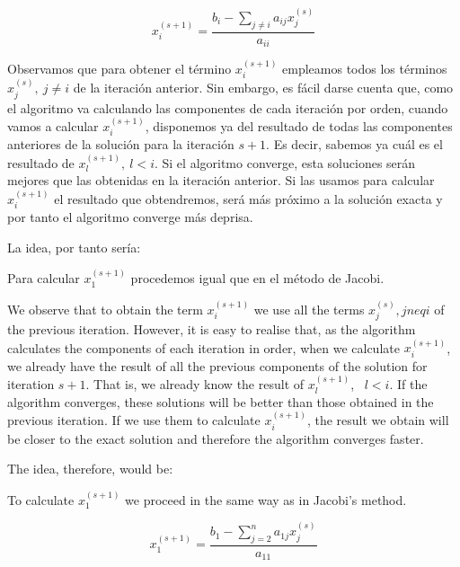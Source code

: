 \begin{equation*}
x_i^{(s+1)}=\frac{b_i-\sum_{j\neq i}a_{ij}x_j^{(s)}}{a_{ii}}
\end{equation*}
\begin{paracol}{2}

Observamos que para obtener el término $x_i^{(s+1)}$ empleamos todos los términos $x_j^{(s)}, \ j\neq i$ de la iteración anterior. Sin embargo, es fácil darse cuenta que, como el algoritmo va calculando las componentes de cada iteración por orden, cuando vamos a calcular $x_i^{(s+1)}$, disponemos ya del resultado de todas las componentes anteriores de la solución para la iteración $s+1$. Es decir, sabemos ya cuál es el resultado de $x_l^{(s+1)}, \  l<i$. Si el algoritmo converge, esta soluciones serán mejores que las obtenidas en la iteración anterior. Si las usamos para calcular $x_i^{(s+1)}$ el resultado que obtendremos, será más próximo a la solución exacta y por tanto el algoritmo converge más deprisa.

La idea, por tanto sería: 

Para calcular $x_1^{(s+1)}$ procedemos igual que en el método de Jacobi. 

\switchcolumn

We observe that to obtain the term $x_i^{(s+1)}$ we use all the terms $x_j^{(s)}, jneq i$ of the previous iteration. However, it is easy to realise that, as the algorithm calculates the components of each iteration in order, when we calculate $x_i^{(s+1)}$, we already have the result of all the previous components of the solution for iteration $s+1$. That is, we already know the result of $x_l^{(s+1)}$, \ $l<i$. If the algorithm converges, these solutions will be better than those obtained in the previous iteration. If we use them to calculate $x_i^{(s+1)}$, the result we obtain will be closer to the exact solution and therefore the algorithm converges faster.

The idea, therefore, would be: 

To calculate $x_1^{(s+1)}$ we proceed in the same way as in Jacobi's method. 

\end{paracol}

\begin{equation*}
x_1^{(s+1)}=\frac{b_1-\sum_{j=2}^n a_{1j}x_j^{(s)}}{a_{11}}
\end{equation*}

